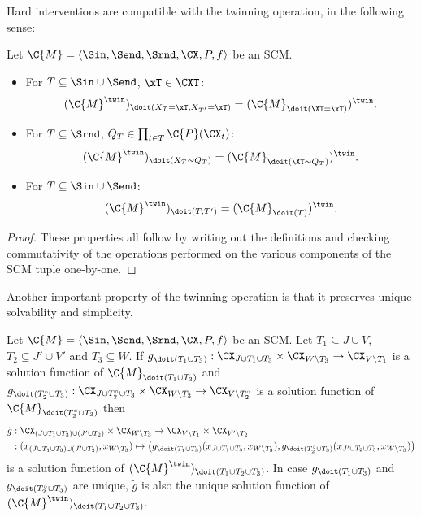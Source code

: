 Hard interventions are compatible with the twinning operation, in the following sense:
\begin{Prp}
Let $\C{M} = \langle \Sin, \Send, \Srnd, \CX, P, f \rangle$ be an SCM.
\begin{itemize}
  \item For $T \subseteq \Sin \cup \Send$, $\xT \in \CXT$:
    $$(\C{M}^\twin)_{\doit(X_T=\xT,X_{T'}=\xT)} = (\C{M}_{\doit(\XT=\xT)})^\twin.$$
  \item For $T \subseteq \Srnd$, $Q_T \in \prod_{t\in T} \C{P}(\CX_t)$:
    $$(\C{M}^\twin)_{\doit(X_T\sim Q_T)} = (\C{M}_{\doit(\XT\sim Q_T)})^\twin.$$
  \item For $T \subseteq \Sin \cup \Send$:
    $$(\C{M}^\twin)_{\doit(T,T')} = (\C{M}_{\doit(T)})^\twin.$$
\end{itemize}
\end{Prp}
\begin{proof}
  These properties all follow by writing out the definitions and checking commutativity of
  the operations performed on the various components of the SCM tuple one-by-one.
\end{proof}
Another important property of the twinning operation is that it preserves unique solvability and simplicity.
\begin{Lem}\label{lem:sol_fns_intervened_twin_scm}
Let $\C{M} = \langle \Sin, \Send, \Srnd, \CX, P, f \rangle$ be an SCM.
Let $T_1 \subseteq J \cup V$, $T_2 \subseteq J' \cup V'$ and $T_3 \subseteq W$. 
If $g_{\doit(T_1\cup T_3)} : \CX_{J \cup T_1 \cup T_3} \times \CX_{W \setminus T_3} \to \CX_{V \setminus T_1}$ is a solution function of $\C{M}_{\doit(T_1\cup T_3)}$ 
and $g_{\doit(T_2^\circ\cup T_3)} : \CX_{J \cup T_2^\circ \cup T_3} \times \CX_{W \setminus T_3} \to \CX_{V \setminus T_2^\circ}$ is a solution function of $\C{M}_{\doit(T_2^\circ \cup T_3)}$ 
then
  \begin{equation*}\begin{split}
    \tilde{g} & : \CX_{(J \cup T_1 \cup T_3) \cup (J' \cup T_2)} \times \CX_{W \setminus T_3} \to \CX_{V \setminus T_1} \times \CX_{V' \setminus T_2} \\
    & : (x_{(J \cup T_1 \cup T_3) \cup (J' \cup T_2)}, x_{W \setminus T_3}) \mapsto \big(g_{\doit(T_1\cup T_3)}(x_{J \cup T_1 \cup T_3},x_{W\setminus T_3}),g_{\doit(T_2^\circ\cup T_3)}(x_{J' \cup T_2 \cup T_3},x_{W \setminus T_3})\big) 
  \end{split}\end{equation*}
is a solution function of $(\C{M}^{\twin})_{\doit(T_1 \cup T_2 \cup T_3)}$.
  In case $g_{\doit(T_1\cup T_3)}$ and $g_{\doit(T_2^\circ \cup T_3)}$ are unique, $\tilde{g}$ is also the
  unique solution function of $(\C{M}^{\twin})_{\doit(T_1 \cup T_2 \cup T_3)}$.
\end{Lem}
